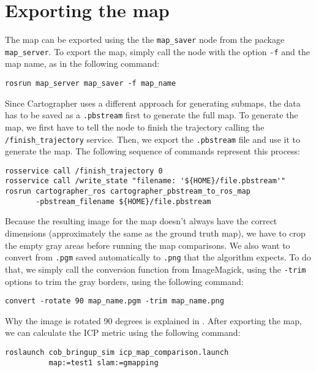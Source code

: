\section{Exporting the map}

The map can be exported using the the \texttt{map\_saver} node from the package \texttt{map\_server}. To export the map, simply call the node with the option \texttt{-f} and the map name, as in the following command:

\begin{verbatim}
rosrun map_server map_saver -f map_name
\end{verbatim}

Since Cartographer uses a different approach for generating submaps, the data has to be saved as a \texttt{.pbstream} first to generate the full map. To generate the map, we first have to tell the node to finish the trajectory calling the \texttt{/finish\_trajectory} service. Then, we export the \texttt{.pbstream} file and use it to generate the map. The following sequence of commands represent this process:

\begin{verbatim}
rosservice call /finish_trajectory 0
rosservice call /write_state "filename: '${HOME}/file.pbstream'"
rosrun cartographer_ros cartographer_pbstream_to_ros_map 
       -pbstream_filename ${HOME}/file.pbstream
\end{verbatim}

Because the resulting image for the map doesn't always have the correct dimensions (approximately the same as the ground truth map), we have to crop the empty gray areas before running the map comparisons. We also want to convert from \texttt{.pgm} saved automatically to \texttt{.png} that the algorithm expects. To do that, we simply call the conversion function from ImageMagick, using the \texttt{-trim} options to trim the gray borders, using the following command:

\begin{verbatim}
convert -rotate 90 map_name.pgm -trim map_name.png
\end{verbatim}

Why the image is rotated 90 degrees is explained in . After exporting the map, we can calculate the ICP metric using the following command:

\begin{verbatim}
roslaunch cob_bringup_sim icp_map_comparison.launch 
          map:=test1 slam:=gmapping
\end{verbatim}


